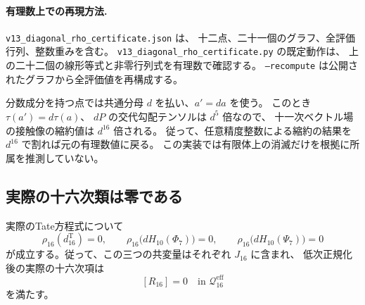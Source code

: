 \paragraph{有理数上での再現方法.}
\texttt{v13\_diagonal\_rho\_certificate.json} は、
十二点、二十一個のグラフ、全評価行列、整数重みを含む。
\texttt{v13\_diagonal\_rho\_certificate.py} の既定動作は、
上の二十二個の線形等式と非零行列式を有理数で確認する。
\texttt{--recompute} は公開されたグラフから全評価値を再構成する。

分数成分を持つ点では共通分母 $d$ を払い、$a'=da$ を使う。
このとき $\tau(a')=d\tau(a)$、
$dP$ の交代勾配テンソルは $d^5$ 倍なので、
十一次ベクトル場の接触像の縮約値は $d^{16}$ 倍される。
従って、任意精度整数による縮約の結果を $d^{16}$ で割れば元の有理数値に戻る。
この実装では有限体上の消滅だけを根拠に所属を推測していない。

\subsection{実際の十六次類は零である}
\label{subsec:v13-actual-sixteenth-zero}

\begin{theorem}[実際の十六次接触類の消滅]
\label{thm:v13-actual-sixteenth-class}
実際のTate方程式について
\[
 \rho_{16}(d^{\mathrm T}_{16})=0,\qquad
 \rho_{16}\bigl(dH_{10}(\Phi_7)\bigr)=0,\qquad
 \rho_{16}\bigl(dH_{10}(\Psi_7)\bigr)=0
\]
が成立する。従って、この三つの共変量はそれぞれ $J_{16}$ に含まれ、
低次正規化後の実際の十六次項は
\[
 \boxed{[R_{16}]=0\quad\text{in }\mathcal Q^{\mathrm{eff}}_{16}}
\]
を満たす。
\end{theorem}

